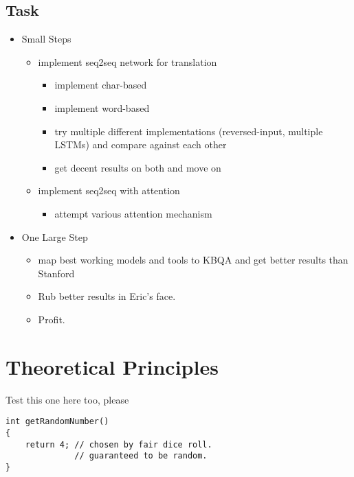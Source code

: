 \documentclass[10pt,a4paper,titlepage,twoside,english, final]{zhawreprt}
\begin{document}
\section{Task}\label{sec:Task}
\begin{itemize}
\item Small Steps
\begin{itemize}
\item implement seq2seq network for translation
\begin{itemize}
\item implement char-based
\item implement word-based
\item try multiple different implementations (reversed-input, multiple LSTMs) and compare against each other
\item get decent results on both and move on
\end{itemize}
\item implement seq2seq with attention
\begin{itemize}
\item attempt various attention mechanism
\end{itemize}
\end{itemize}
\item One Large Step
\begin{itemize}
\item map best working models and tools to KBQA and get better results than Stanford
\item Rub better results in Eric's face.
\item Profit.
\end{itemize}
\end{itemize}

\chapter{Theoretical Principles}\label{chp:TheoreticalPrinciples}
Test this one here too, please
\setlistingCSharp
\begin{lstlisting}[linebackgroundcolor={\inlist{lstnumber}{3,4}}]
int getRandomNumber()
{
	return 4; // chosen by fair dice roll.
			  // guaranteed to be random.
}
\end{lstlisting}
\end{document}
